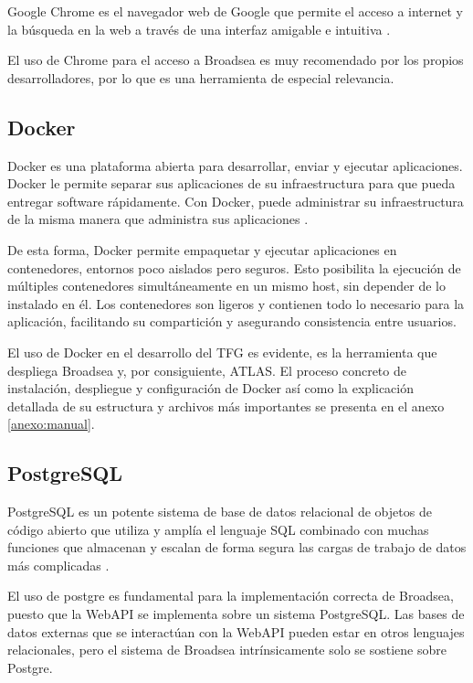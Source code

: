 Google Chrome es el navegador web de Google que permite el acceso a internet y la búsqueda en la web a través de una interfaz amigable e intuitiva \cite{GoogleChrome}. 

El uso de Chrome para el acceso a Broadsea es muy recomendado por los propios desarrolladores, por lo que es una herramienta de especial relevancia.

\subsection{Docker}

Docker es una plataforma abierta para desarrollar, enviar y ejecutar aplicaciones. Docker le permite separar sus aplicaciones de su infraestructura para que pueda entregar software rápidamente. Con Docker, puede administrar su infraestructura de la misma manera que administra sus aplicaciones \cite{DockerWebsite}.

De esta forma, Docker permite empaquetar y ejecutar aplicaciones en contenedores, entornos poco aislados pero seguros. Esto posibilita la ejecución de múltiples contenedores simultáneamente en un mismo host, sin depender de lo instalado en él. Los contenedores son ligeros y contienen todo lo necesario para la aplicación, facilitando su compartición y asegurando consistencia entre usuarios. 

El uso de Docker en el desarrollo del TFG es evidente, es la herramienta que despliega Broadsea y, por consiguiente, ATLAS. El proceso concreto de instalación, despliegue y configuración de Docker así como la explicación detallada de su estructura y archivos más importantes se presenta en el anexo \ref{anexo:manual}.

\subsection{PostgreSQL}

PostgreSQL es un potente sistema de base de datos relacional de objetos de código abierto que utiliza y amplía el lenguaje SQL combinado con muchas funciones que almacenan y escalan de forma segura las cargas de trabajo de datos más complicadas \cite{PostgreWebsite}.

El uso de postgre es fundamental para la implementación correcta de Broadsea, puesto que la WebAPI se implementa sobre un sistema PostgreSQL. Las bases de datos externas que se interactúan con la WebAPI pueden estar en otros lenguajes relacionales, pero el sistema de Broadsea intrínsicamente solo se sostiene sobre Postgre.

